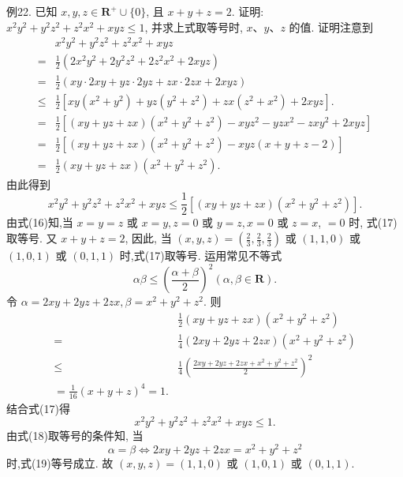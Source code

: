 例22. 已知 $x, y, z \in \mathbf{R}^{+} \cup\{0\}$, 且 $x+y+z=2$.
证明: $x^2 y^2+y^2 z^2+z^2 x^2+x y z \leqslant 1$, 并求上式取等号时, $x 、 y 、 z$ 的值.
证明注意到
$$
\begin{aligned}
& x^2 y^2+y^2 z^2+z^2 x^2+x y z \\
= & \frac{1}{2}\left(2 x^2 y^2+2 y^2 z^2+2 z^2 x^2+2 x y z\right) \\
= & \frac{1}{2}(x y \cdot 2 x y+y z \cdot 2 y z+z x \cdot 2 z x+2 x y z) \\
\leqslant & \frac{1}{2}\left[x y\left(x^2+y^2\right)+y z\left(y^2+z^2\right)+z x\left(z^2+x^2\right)+2 x y z\right] . \label{(16)} \\
= & \frac{1}{2}\left[(x y+y z+z x)\left(x^2+y^2+z^2\right)-x y z^2-y z x^2-z x y^2+2 x y z\right] \\
= & \frac{1}{2}\left[(x y+y z+z x)\left(x^2+y^2+z^2\right)-x y z(x+y+z-2)\right] \\
= & \frac{1}{2}(x y+y z+z x)\left(x^2+y^2+z^2\right) .
\end{aligned}
$$
由此得到
$$
x^2 y^2+y^2 z^2+z^2 x^2+x y z \leqslant \frac{1}{2}\left[(x y+y z+z x)\left(x^2+y^2+z^2\right)\right] . \label{(17)}
$$
由式(16)知,当 $x=y=z$ 或 $x=y, z=0$ 或 $y=z, x=0$ 或 $z=x$, $=0$ 时, 式(17)取等号.
又 $x+y+z=2$, 因此, 当
$(x, y, z)=\left(\frac{2}{3}, \frac{2}{3}, \frac{2}{3}\right)$ 或 $(1,1,0)$ 或 $(1,0,1)$ 或 $(0,1,1)$ 时,式(17)取等号.
运用常见不等式
$$
\alpha \beta \leqslant\left(\frac{\alpha+\beta}{2}\right)^2(\alpha, \beta \in \mathbf{R}) .
$$
令 $\alpha=2 x y+2 y z+2 z x, \beta=x^2+y^2+z^2$. 则
$$
\begin{aligned}
& \frac{1}{2}(x y+y z+z x)\left(x^2+y^2+z^2\right) \\
= & \frac{1}{4}(2 x y+2 y z+2 z x)\left(x^2+y^2+z^2\right) \\
\leqslant & \frac{1}{4}\left(\frac{2 x y+2 y z+2 z x+x^2+y^2+z^2}{2}\right)^2 \\
=\frac{1}{16}(x+y+z)^4=1 . \label{(18)}
\end{aligned}
$$
结合式(17)得
$$
x^2 y^2+y^2 z^2+z^2 x^2+x y z \leqslant 1 . \label{(19)}
$$
由式(18)取等号的条件知, 当
$$
\alpha=\beta \Leftrightarrow 2 x y+2 y z+2 z x=x^2+y^2+z^2
$$
时,式(19)等号成立.
故 $(x, y, z)=(1,1,0)$ 或 $(1,0,1)$ 或 $(0,1,1)$.



